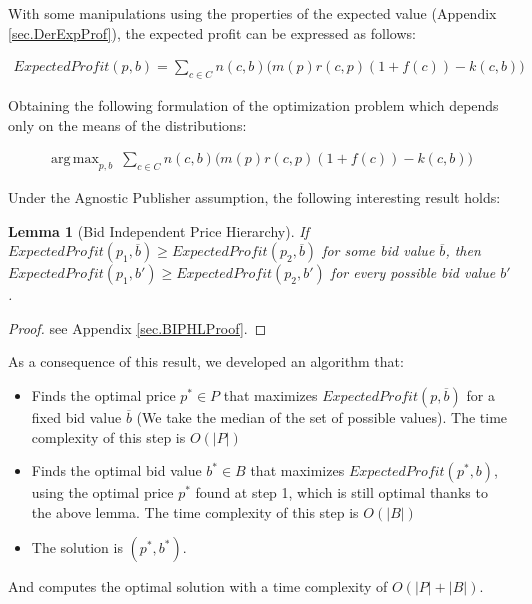\documentclass[11pt]{article} %
\DeclareMathOperator*{\argmax}{arg\,max}
\newtheorem*{lemma}{Lemma}
\begin{document}
With some manipulations using the properties of the expected value (Appendix \ref{sec.DerExpProf}), the expected profit can be expressed as follows:

\begin{align*}
ExpectedProfit(p,b)=\sum_{c \in C}{n(c,b)\Big(m(p)r(c,p)(1+f(c))-k(c,b)\Big)}
\end{align*}

Obtaining the following formulation of the optimization problem which depends only on the means of the distributions:

\begin{align*}
\argmax_{p,b}{\ \sum_{c \in C}{n(c,b)\Big(m(p)r(c,p)(1+f(c))-k(c,b)\Big)}}
\end{align*}

Under the Agnostic Publisher assumption, the following interesting result holds:

\begin{lemma}[Bid Independent Price Hierarchy]
If $ExpectedProfit(p_1,\overline b) \ge ExpectedProfit(p_2,\overline b)$ for some bid value $\overline b$,  then $ExpectedProfit(p_1, b') \ge ExpectedProfit(p_2, b')$  for every possible bid value $b'$.
\end{lemma}
\begin{proof}
see Appendix \ref{sec.BIPHLProof}.
\end{proof}

As a consequence of this result, we developed an algorithm that:
\begin{itemize}
\item Finds the optimal price $p^*\in P$ that maximizes $ExpectedProfit(p,\overline b)$ for a fixed bid value $\overline b$ (We take the median of the set of possible values). The time complexity of this step is $O(|P|)$
\item Finds the optimal bid value $b^* \in B$ that maximizes $ExpectedProfit(p^*, b)$, using the optimal price $p^*$ found at step 1, which is still optimal thanks to the above lemma. The time complexity of this step is $O(|B|)$
\item The solution is $(p^*, b^*)$.
\end{itemize}
And computes the optimal solution with a time complexity of $O(|P|+|B|)$.


\clearpage
\end{document}
